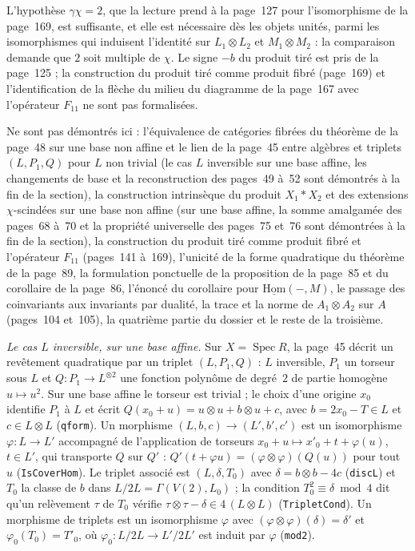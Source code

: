 \begin{remarque}
L'hypothèse $\gamma\chi = 2$, que la lecture prend à la page~127 pour l'isomorphisme de la page~169, est suffisante, et elle est nécessaire dès les objets unités, parmi les isomorphismes qui induisent l'identité sur $L_1 \otimes L_2$ et $M_1 \otimes M_2$ : la comparaison demande que $2$ soit multiple de $\chi$. Le signe $-b$ du produit tiré est pris de la page~125 ; la construction du produit tiré comme produit fibré (page~169) et l'identification de la flèche du milieu du diagramme de la page~167 avec l'opérateur $F_{11}$ ne sont pas formalisées.
\end{remarque}

Ne sont pas démontrés ici : l'équivalence de catégories fibrées du théorème de la page~48 sur une base non affine et le lien de la page~45 entre algèbres et triplets $(L, P_1, Q)$ pour $L$ non trivial (le cas $L$ inversible sur une base affine, les changements de base et la reconstruction des pages~49 à~52 sont démontrés à la fin de la section), la construction intrinsèque du produit $X_1 * X_2$ et des extensions $\chi$-scindées sur une base non affine (sur une base affine, la somme amalgamée des pages~68 à~70 et la propriété universelle des pages~75 et~76 sont démontrées à la fin de la section), la construction du produit tiré comme produit fibré et l'opérateur $F_{11}$ (pages~141 à~169), l'unicité de la forme quadratique du théorème de la page~89, la formulation ponctuelle de la proposition de la page~85 et du corollaire de la page~86, l'énoncé du corollaire pour $\underline{\mathrm{Hom}}(-, M)$, le passage des coinvariants aux invariants par dualité, la trace et la norme de $A_1 \otimes A_2$ sur $A$ (pages~104 et~105), la quatrième partie du dossier et le reste de la troisième.

\noindent\emph{Le cas $L$ inversible, sur une base affine.} Sur $X = \operatorname{Spec} R$, la page~45 décrit un revêtement quadratique par un triplet $(L, P_1, Q)$ : $L$ inversible, $P_1$ un torseur sous $L$ et $Q : P_1 \to L^{\otimes 2}$ une fonction polynôme de degré~$2$ de partie homogène $u \mapsto u^2$. Sur une base affine le torseur est trivial ; le choix d'une origine $x_0$ identifie $P_1$ à $L$ et écrit $Q(x_0 + u) = u \otimes u + b \otimes u + c$, avec $b = 2x_0 - T \in L$ et $c \in L \otimes L$ (\texttt{qform}). Un morphisme $(L, b, c) \to (L', b', c')$ est un isomorphisme $\varphi : L \to L'$ accompagné de l'application de torseurs $x_0 + u \mapsto x'_0 + t + \varphi(u)$, $t \in L'$, qui transporte $Q$ sur $Q'$ : $Q'(t + \varphi u) = (\varphi \otimes \varphi)(Q(u))$ pour tout $u$ (\texttt{IsCoverHom}). Le triplet associé est $(L, \delta, T_0)$ avec $\delta = b \otimes b - 4c$ (\texttt{discL}) et $T_0$ la classe de $b$ dans $L/2L = \Gamma(V(2), L_0)$ ; la condition $T_0^2 \equiv \delta \bmod 4$ dit qu'un relèvement $\tau$ de $T_0$ vérifie $\tau \otimes \tau - \delta \in 4\,(L \otimes L)$ (\texttt{TripletCond}). Un morphisme de triplets est un isomorphisme $\varphi$ avec $(\varphi \otimes \varphi)(\delta) = \delta'$ et $\varphi_0(T_0) = T'_0$, où $\varphi_0 : L/2L \to L'/2L'$ est induit par $\varphi$ (\texttt{mod2}).

